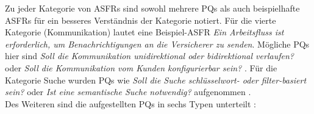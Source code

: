 Zu jeder Kategorie von ASFRs sind sowohl mehrere PQs als auch beispielhafte ASFRs f\"ur ein besseres Verst\"andnis der Kategorie notiert. F\"ur die vierte Kategorie (Kommunikation) lautet eine Beispiel-ASFR \textit{Ein Arbeitsfluss ist erforderlich, um Benachrichtigungen an die Versicherer zu senden}. M\"ogliche PQs hier sind \textit{Soll die Kommunikation unidirektional oder bidirektional verlaufen?} oder \textit{Soll die Kommunikation vom Kunden konfigurierbar sein?} \cite{Ros03}. F\"ur die Kategorie Suche wurden PQs wie \textit{Soll die Suche schl\"usselwort- oder filter-basiert sein?} oder \textit{Ist eine semantische Suche notwendig?} aufgenommen \cite{Ros03}. \\

Des Weiteren sind die aufgestellten PQs in sechs Typen unterteilt \cite{Ros02}: \\

